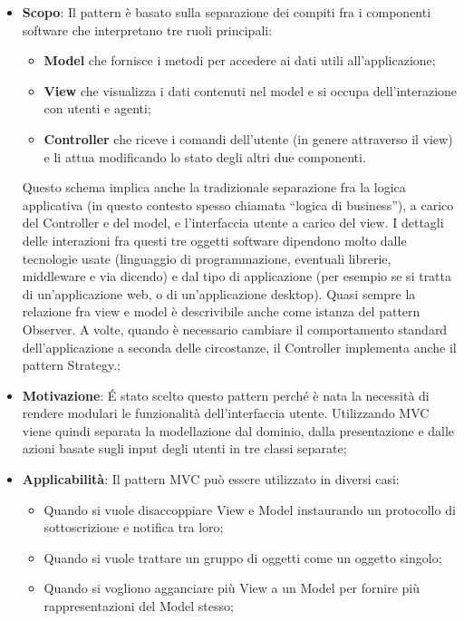 		\begin{itemize}
			\item \textbf{Scopo}: Il pattern è basato sulla separazione dei compiti fra i componenti software che interpretano tre ruoli principali:

		\begin{itemize}
			\item \textbf{Model} che fornisce i metodi per accedere ai dati utili all'applicazione;
			\item \textbf{View} che visualizza i dati contenuti nel model e si occupa dell'interazione con utenti e agenti;
			\item \textbf{Controller} che riceve i comandi dell'utente (in genere attraverso il view) e li attua modificando lo stato degli altri due componenti.
		\end{itemize}

		\noindent
		Questo schema implica anche la tradizionale separazione fra la logica applicativa (in questo contesto spesso chiamata ``logica di business''), a carico del Controller e del model, e l'interfaccia utente a carico del view. I dettagli delle interazioni fra questi tre oggetti software dipendono molto dalle tecnologie usate (linguaggio di programmazione, eventuali librerie, middleware e via dicendo) e dal tipo di applicazione (per esempio se si tratta di un'applicazione web, o di un'applicazione desktop). Quasi sempre la relazione fra view e model è descrivibile anche come istanza del pattern Observer. A volte, quando è necessario cambiare il comportamento standard dell'applicazione a seconda delle circostanze, il Controller implementa anche il pattern Strategy.;

			\item \textbf{Motivazione}: \'E stato scelto questo pattern perché è nata la necessità di rendere modulari le funzionalità dell'interfaccia utente. Utilizzando MVC viene quindi separata la modellazione dal dominio, dalla presentazione e dalle azioni basate sugli input degli utenti in tre classi separate;

			\item \textbf{Applicabilità}: Il pattern MVC può essere utilizzato in diversi casi:

			\begin{itemize}
			\item  Quando si vuole disaccoppiare View e Model instaurando un protocollo di sottoscrizione e notifica tra loro;
			\item Quando si vuole trattare un gruppo di oggetti come un oggetto singolo;
			\item Quando si vogliono agganciare più View a un Model per fornire più rappresentazioni del Model stesso;
			\end{itemize}

		\end{itemize}


